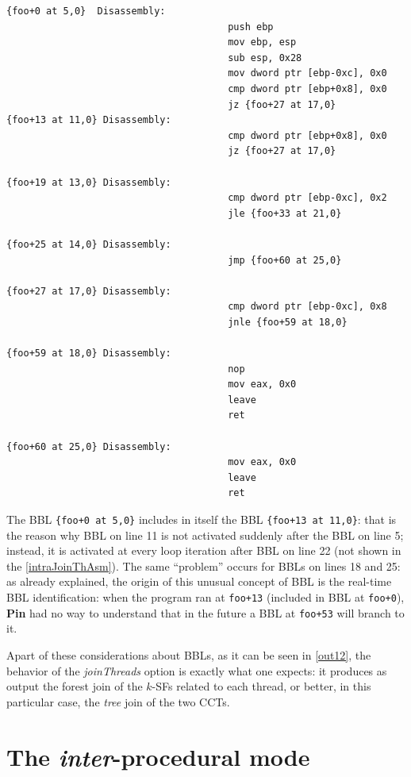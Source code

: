 \documentclass[a4paper,11pt]{report}
\begin{document}
\begin{lstlisting}[language={[x86masm]Assembler}, 
	label=intraJoinThAsm, caption={a part of ``all basic blocks'' table of \texttt{prog5}}]
{foo+0 at 5,0}  Disassembly: 
								       push ebp
								       mov ebp, esp
								       sub esp, 0x28
								       mov dword ptr [ebp-0xc], 0x0
								       cmp dword ptr [ebp+0x8], 0x0
								       jz {foo+27 at 17,0}
{foo+13 at 11,0} Disassembly: 
								       cmp dword ptr [ebp+0x8], 0x0
								       jz {foo+27 at 17,0}

{foo+19 at 13,0} Disassembly: 
								       cmp dword ptr [ebp-0xc], 0x2
								       jle {foo+33 at 21,0}

{foo+25 at 14,0} Disassembly: 
								       jmp {foo+60 at 25,0}

{foo+27 at 17,0} Disassembly: 
								       cmp dword ptr [ebp-0xc], 0x8
								       jnle {foo+59 at 18,0}

{foo+59 at 18,0} Disassembly: 
								       nop 
								       mov eax, 0x0
								       leave 
								       ret 

{foo+60 at 25,0} Disassembly: 
								       mov eax, 0x0
								       leave 
								       ret 

\end{lstlisting}

The BBL \verb|{foo+0 at 5,0}| includes in itself the BBL \verb|{foo+13 at 11,0}|: 
that is the reason why BBL on line 11 is not activated suddenly 
after the BBL on line 5; instead, it is activated at every loop iteration 
after BBL on line 22 (not shown in the \cref{intraJoinThAsm}). 
The same ``problem'' occurs for BBLs on lines 18 and 25: 
as already explained, the origin of this unusual concept of BBL is the real-time BBL 
identification: when the program ran at \verb|foo+13| (included in BBL at \verb|foo+0|),
\textbf{Pin} had no way to understand that in the future a BBL at \verb|foo+53| will 
branch to it.

Apart of these considerations about BBLs, as it can be seen in \cref{out12},
the behavior of the \emph{joinThreads} option is exactly what one expects: 
it produces as output the forest join of the $k$-SFs related to each thread, 
or better, in this particular case, the \emph{tree} join of the two CCTs.

\section{The \emph{inter}-procedural mode}
\end{document}
